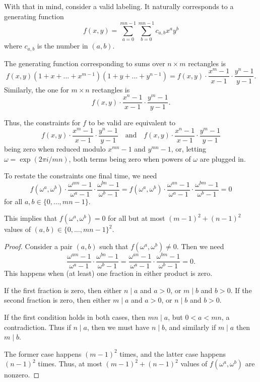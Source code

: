 \documentclass[11pt]{scrartcl}
\begin{document}
With that in mind, consider a valid labeling.
It naturally corresponds to a generating function
\[ f(x, y) = \sum_{a=0}^{mn-1} \sum_{b=0}^{mn-1} c_{a, b} x^a y^b \]
where $c_{a, b}$ is the number in $(a, b)$.

The generating function corresponding to sums over $n \times m$ rectangles is
\[
  f(x, y) (1 + x + \dots + x^{m-1}) (1 + y + \dots + y^{n-1})
  = f(x, y) \cdot \frac{x^m - 1}{x - 1} \cdot \frac{y^n - 1}{y - 1}.
\]
Similarly, the one for $m \times n$ rectangles is
\[ f(x, y) \cdot \frac{x^n - 1}{x - 1} \cdot \frac{y^m - 1}{y - 1}. \]

Thus, the constraints for $f$ to be valid are equivalent to
\[
  f(x, y) \cdot \frac{x^m - 1}{x - 1} \cdot \frac{y^n - 1}{y - 1}
  \quad \text{and} \quad
  f(x, y) \cdot \frac{x^n - 1}{x - 1} \cdot \frac{y^m - 1}{y - 1}
\]
being zero when reduced modulo $x^{mn} - 1$ and $y^{mn} - 1$,
or, letting $\omega = \exp(2\pi i/mn)$,
both terms being zero when powers of $\omega$ are plugged in.

To restate the constraints one final time, we need
\[
  f(\omega^a, \omega^b) \cdot \frac{\omega^{am} - 1}{\omega^a - 1} \cdot \frac{\omega^{bn} - 1}{\omega^b - 1}
  = f(\omega^a, \omega^b) \cdot \frac{\omega^{an} - 1}{\omega^a - 1} \cdot \frac{\omega^{bm} - 1}{\omega^b - 1} = 0
\]
for all $a, b \in \{0, \dots, mn-1\}$.

\begin{claim*}
  This implies that $f(\omega^a, \omega^b) = 0$
  for all but at most $(m-1)^2 + (n-1)^2$ values of $(a,b) \in \{0, \dots, mn-1\}^2$.
\end{claim*}
\begin{proof}
  Consider a pair $(a,b)$ such that $f(\omega^a, \omega^b) \neq 0$.
  Then we need
  \[
    \frac{\omega^{am} - 1}{\omega^a - 1} \cdot \frac{\omega^{bn} - 1}{\omega^b - 1}
    = \frac{\omega^{an} - 1}{\omega^a - 1} \cdot \frac{\omega^{bm} - 1}{\omega^b - 1} = 0.
  \]
  This happens when (at least) one fraction in either product is zero.
  \begin{itemize}
    \ii If the first fraction is zero,
    then either $n \mid a$ and $a > 0$, or $m \mid b$ and $b > 0$.
    \ii If the second fraction is zero,
    then either $m \mid a$ and $a > 0$, or $n \mid b$ and $b > 0$.
  \end{itemize}
  If the first condition holds in both cases, then $mn \mid a$, but $0 < a < mn$,
  a contradiction. Thus if $n \mid a$, then we must have $n \mid b$, and similarly
  if $m \mid a$ then $m \mid b$.

  The former case happens $(m-1)^2$ times, and the latter case happens $(n-1)^2$ times.
  Thus, at most $(m-1)^2 + (n-1)^2$ values of $f(\omega^a, \omega^b)$ are nonzero.
\end{proof}
\end{document}

